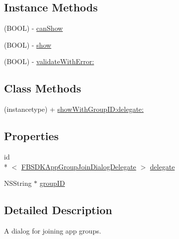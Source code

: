 \subsection*{Instance Methods}
\begin{DoxyCompactItemize}
\item 
(B\-O\-O\-L) -\/ \hyperlink{interface_f_b_s_d_k_app_group_join_dialog_a3bf5924eb50f3694d7b57c11e723e74c}{can\-Show}
\item 
(B\-O\-O\-L) -\/ \hyperlink{interface_f_b_s_d_k_app_group_join_dialog_a700d110bc5ab9e0671551c794a733cd2}{show}
\item 
(B\-O\-O\-L) -\/ \hyperlink{interface_f_b_s_d_k_app_group_join_dialog_ac5b458a8ac19314578e773c72ccaf84f}{validate\-With\-Error\-:}
\end{DoxyCompactItemize}
\subsection*{Class Methods}
\begin{DoxyCompactItemize}
\item 
(instancetype) + \hyperlink{interface_f_b_s_d_k_app_group_join_dialog_a0d3ac5886ce882f57393e5e950ea4aa0}{show\-With\-Group\-I\-D\-:delegate\-:}
\end{DoxyCompactItemize}
\subsection*{Properties}
\begin{DoxyCompactItemize}
\item 
id\\*
$<$ \hyperlink{protocol_f_b_s_d_k_app_group_join_dialog_delegate-p}{F\-B\-S\-D\-K\-App\-Group\-Join\-Dialog\-Delegate} $>$ \hyperlink{interface_f_b_s_d_k_app_group_join_dialog_a3ee58c32085dab11678cbd1805d62231}{delegate}
\item 
N\-S\-String $\ast$ \hyperlink{interface_f_b_s_d_k_app_group_join_dialog_aceeba0e2821c837cd9ae2caf3d6ea890}{group\-I\-D}
\end{DoxyCompactItemize}


\subsection{Detailed Description}
A dialog for joining app groups. 

